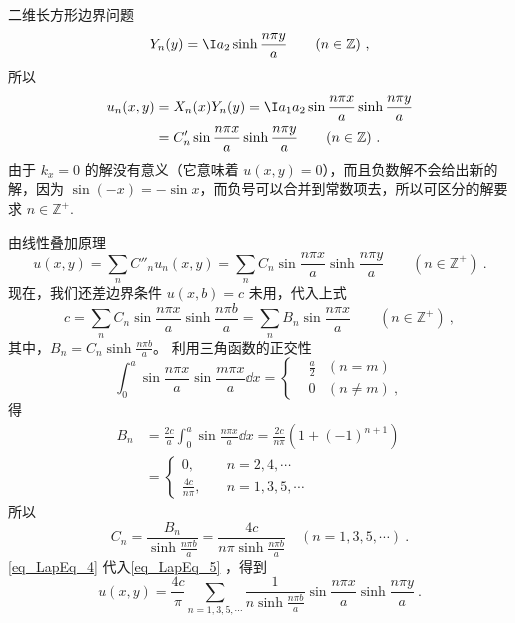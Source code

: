\begin{example}{二维长方形边界问题}
\begin{equation}
Y_n(y)=\I a_2\sinh\frac{n\pi y}{a}\qquad (n\in \mathbb{Z})~,
\end{equation}
所以
\begin{equation}
\begin{aligned}
u_n(x,y)&=X_n(x)Y_n(y)=\I a_1a_2\sin\frac{n\pi x}{a}\sinh\frac{n\pi y}{a}\\
&=C'_n\sin\frac{n\pi x}{a}\sinh\frac{n\pi y}{a} \qquad (n\in\mathbb{Z})~.
\end{aligned}
\end{equation}
由于 $k_x=0$ 的解没有意义（它意味着 $u(x,y)=0$），而且负数解不会给出新的解，因为 $\sin(-x)=-\sin x$，而负号可以合并到常数项去，所以可区分的解要求 $n\in\mathbb{Z^+}$.

由线性叠加原理
\begin{equation}\label{eq_LapEq_5}
u(x,y)=\sum_n C''_n u_n(x,y)=\sum_n C_n\sin\frac{n\pi x}{a}\sinh\frac{n\pi y}{a} \qquad  (n\in\mathbb{Z^+})~.
\end{equation}
现在，我们还差边界条件 $u(x,b)=c$ 未用，代入上式
\begin{equation}
c=\sum_n C_n\sin\frac{n\pi x}{a}\sinh\frac{n\pi b}{a}=\sum_n B_n\sin\frac{n\pi x}{a} \qquad (n\in\mathbb{Z^+})~,
\end{equation}
其中，$B_n=C_n\sinh \frac{n\pi b}{a}$。
利用三角函数的正交性
\begin{equation}
\int_0^a\sin\frac{n\pi x}{a}\sin\frac{m\pi x}{a}\dd x=\left\{\begin{aligned}
&\frac{a}{2}&(n=m)\\
& 0     &(n\neq m)~,
\end{aligned}\right.
\end{equation}
得
\begin{equation}
\begin{aligned}
B_n
&=\frac{2c}{a}\int_0^a\sin\frac{n\pi x}{a}\dd x=\frac{2c}{n\pi}(1+(-1)^{n+1})\\
&=\left\{\begin{aligned}
0,&\quad n=2,4,\cdots~\\
\frac{4c}{n\pi},&\quad n=1,3,5,\cdots~
\end{aligned}\right.
\end{aligned}~
\end{equation}
所以
\begin{equation}\label{eq_LapEq_4}
C_n=\frac{B_n}{\sinh \frac{n\pi b}{a}}=\frac{4c}{n\pi\sinh \frac{n\pi b}{a}}\quad
(n=1,3,5,\cdots)~.
\end{equation}
\autoref{eq_LapEq_4} 代入\autoref{eq_LapEq_5} ，得到
\begin{equation}
u(x,y)=\frac{4c}{\pi}\sum_{n=1,3,5,\cdots} \frac{1}{n\sinh \frac{n\pi b}{a}}\sin\frac{n\pi x}{a}\sinh\frac{n\pi y}{a}~.
\end{equation}
\end{example}
